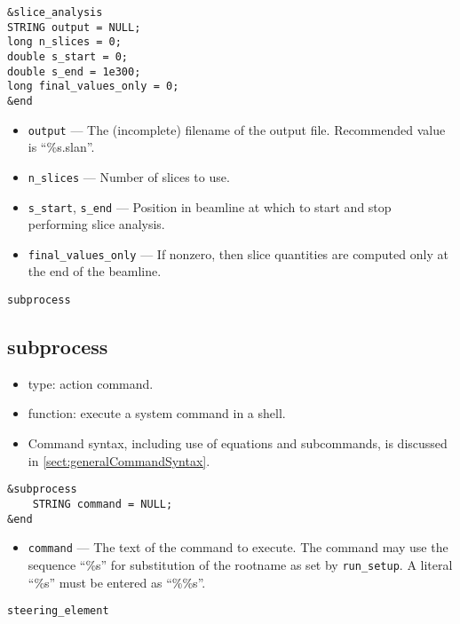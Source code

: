 \documentclass[11pt]{article}
\begin{document}
\begin{verbatim}
&slice_analysis
STRING output = NULL;
long n_slices = 0;
double s_start = 0;
double s_end = 1e300;
long final_values_only = 0;
&end
\end{verbatim}

\begin{itemize}
\item \verb|output| --- The (incomplete) filename of the output file.
	Recommended value is ``\%s.slan''.
\item \verb|n_slices| --- Number of slices to use.
\item \verb|s_start|, \verb|s_end| --- Position in beamline at which to start
        and stop performing slice analysis.
\item \verb|final_values_only| --- If nonzero, then slice quantities are computed
        only at the end of the beamline.
\end{itemize}

\newpage
\begin{center}{\Large\verb|subprocess|}\end{center}
\subsection{subprocess \label{subsec:subprocess}}

\begin{itemize}
\item type: action command.
\item function: execute a system command in a shell.
\item Command syntax, including use of equations and subcommands, is discussed in \ref{sect:generalCommandSyntax}.
\end{itemize}

\begin{verbatim}
&subprocess 
    STRING command = NULL;
&end
\end{verbatim}

\begin{itemize}
\item \verb|command| --- The text of the command to execute.  The command may
use the sequence ``\%s'' for substitution of the rootname as set by \verb|run_setup|.
A literal ``\%s'' must be entered as ``\%\%s''.
\end{itemize}

\newpage
\begin{center}{\Large\verb|steering_element|}\end{center}
\end{document}
